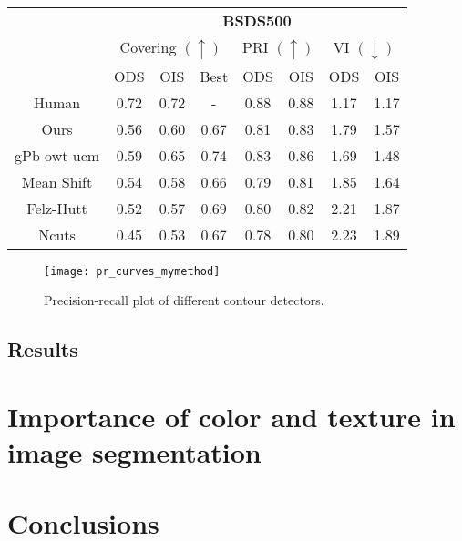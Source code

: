\begin{table}[]
\centering
\begin{tabular}{c|c|c|c||c|c||c|c|}
\cline{2-8}
                                  & \multicolumn{7}{c|}{\textbf{BSDS500}}                                                                                       \\ \cline{2-8} 
                                  & \multicolumn{3}{c||}{Covering $(\uparrow)$} & \multicolumn{2}{c||}{PRI $(\uparrow)$} & \multicolumn{2}{c|}{VI $(\downarrow)$} \\ \cline{2-8} 
                                  & ODS          & OIS          & Best         & ODS               & OIS               & ODS                & OIS               \\ \hline
\multicolumn{1}{|c|}{Human}       & 0.72         & 0.72         & -            & 0.88              & 0.88              & 1.17               & 1.17              \\ \hline
\multicolumn{1}{|c|}{Ours}        & 0.56         & 0.60         & 0.67         & 0.81              & 0.83              & 1.79               & 1.57              \\ \hline
\multicolumn{1}{|c|}{gPb-owt-ucm} & 0.59         & 0.65         & 0.74         & 0.83              & 0.86              & 1.69               & 1.48              \\ \hline
\multicolumn{1}{|c|}{Mean Shift}  & 0.54         & 0.58         & 0.66         & 0.79              & 0.81              & 1.85               & 1.64              \\ \hline
\multicolumn{1}{|c|}{Felz-Hutt}   & 0.52         & 0.57         & 0.69         & 0.80              & 0.82              & 2.21               & 1.87              \\ \hline
\multicolumn{1}{|c|}{Ncuts}       & 0.45         & 0.53         & 0.67         & 0.78              & 0.80              & 2.23               & 1.89              \\ \hline
\end{tabular}
\end{table}

\begin{figure}[!ht]
	\centering
	\texttt{[image: pr\_curves\_mymethod]}
	\caption{Precision-recall plot of different contour detectors.}\label{fig:pr_curves}
\end{figure}
\subsection{Results}


\section{Importance of color and texture in image segmentation}


\section{Conclusions}
